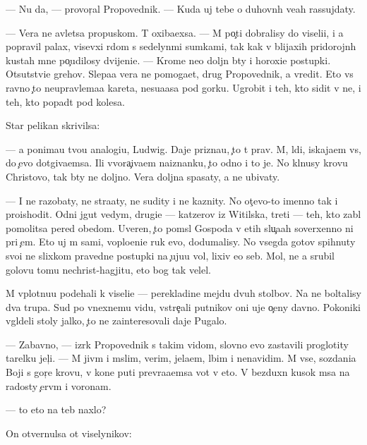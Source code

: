 \documentclass[10pt]{book}
\begin{document}
— Nu da, — provor{\c}al Propovednik. — Kuda uj tebe o duhovn{\yi}h ve{\x}ah rassujdaty.

— Vera ne {\y}avl{\ia}{\y}etsa propuskom. T{\yi} oxiba{\y}exsa. — M{\yi} po{\c}ti dobralisy do viseli{\q}i, i {\y}a popravil palax, visevxi{\y} r{\ia}dom s sedelyn{\yi}mi sumkami, tak kak v blija{\y}xih pridorojn{\yi}h kustah mne po{\c}udilosy dvijeni{\y}e. — Krome ne{\y}o doljn{\yi} b{\yi}ty i horoxi{\y}e postupki. Otsutstvi{\y}e grehov. Slepa{\y}a vera ne pomoga{\y}et, drug Propovednik, a vredit. Eto vs{\e} ravno {\c}to neupravl{\ia}{\y}ema{\y}a kareta, nesu{\x}a{\y}asa pod gorku. Ugrobit i teh, kto sidit v ne{\y}, i teh, kto popad{\e}t pod kolesa.

Star{\yi}{\y} pelikan skrivilsa:

— {\Y}a ponima{\y}u tvo{\y}u analogi{\y}u, Ludwig. Daje prizna{\y}u, {\c}to t{\yi} prav. M{\yi}, l{\iu}di, iskaja{\y}em vs{\e}, do {\c}evo dot{\ia}giva{\y}emsa. Ili v{\yi}vora{\c}iva{\y}em naiznanku, {\c}to odno i to je. No kl{\ia}nusy krov{\y}u Christovo{\y}, tak b{\yi}ty ne doljno. Vera doljna spasaty, a ne ubivaty.

— I ne razob{\x}aty, ne stra{\x}aty, ne sudity i ne kaznity. No ot{\c}evo-to imenno tak i proishodit. Odni jgut vedym, drugi{\y}e — katzerov iz Witilska, tret{\yf}i — teh, kto zab{\yi}l pomolitsa pered obedom. Uveren, {\c}to pom{\yi}sl{\yi} Gospoda v etih slu{\c}a{\y}ah soverxenno ni pri {\c}em. Eto uj m{\yi} sami, voplo{\x}eni{\y}e ruk {\y}evo, dodumalisy. No vsegda gotov{\yi} spihnuty svo{\y}i ne slixkom pravedn{\yi}{\y}e postupki na {\c}uju{\y}u vol{\iu}, lixiv {\y}e{\y}o seb{\ia}. Mol, ne {\y}a srubil golovu tomu nechrist{\iu}-hagjitu, eto bog tak velel.

M{\yi} vplotnu{\y}u pod{\y}ehali k viseli{\q}e — perekladine mejdu dvuh stolbov. Na ne{\y} boltalisy dva trupa. Sud{\ia} po vnexnemu vidu, vstre{\c}ali putnikov oni uje o{\c}eny davno. Poko{\y}niki v{\yi}gl{\ia}deli stoly jalko, {\c}to ne zainteresovali daje Pugalo.

— Zabavno, — izr{\e}k Propovednik s takim vidom, slovno {\y}evo zastavili proglotity tarelku jel{\c}i. — M{\yi} jiv{\e}m i m{\yi}slim, verim, jela{\y}em, l{\iu}bim i nenavidim. M{\yi} vse, sozdani{\y}a Boj{\yf}i s gor{\ia}{\c}e{\y} krov{\y}u, v kon{\q}e puti prevra{\x}a{\y}emsa vot v eto. V bezduxn{\yi}{\y} kusok m{\ia}sa na radosty {\c}erv{\ia}m i voronam.

— {\C}to eto na teb{\ia} naxlo?

On otvernulsa ot viselynikov:
\end{document}
